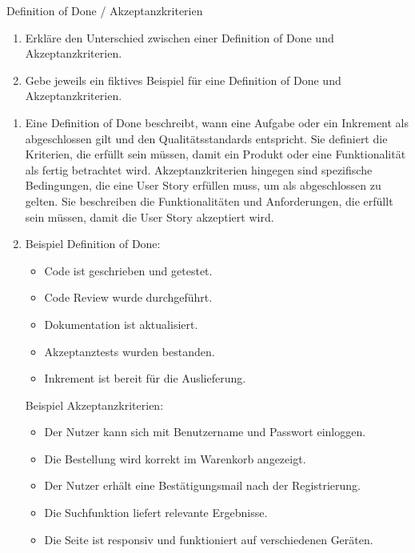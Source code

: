 \documentclass{article}
\begin{document}
\begin{exercise}{Definition of Done / Akzeptanzkriterien}
  \begin{enumerate}
    \item Erkläre den Unterschied zwischen einer Definition of Done und Akzeptanzkriterien.
    \item Gebe jeweils ein fiktives Beispiel für eine Definition of Done und Akzeptanzkriterien.
  \end{enumerate}

  \begin{solution}
    \begin{enumerate}
      \item Eine Definition of Done beschreibt, wann eine Aufgabe oder ein Inkrement als abgeschlossen gilt und den Qualitätsstandards entspricht. Sie definiert die Kriterien, die erfüllt sein müssen, damit ein Produkt oder eine Funktionalität als fertig betrachtet wird. Akzeptanzkriterien hingegen sind spezifische Bedingungen, die eine User Story erfüllen muss, um als abgeschlossen zu gelten. Sie beschreiben die Funktionalitäten und Anforderungen, die erfüllt sein müssen, damit die User Story akzeptiert wird.
      \item Beispiel Definition of Done:
            \begin{itemize}
              \item Code ist geschrieben und getestet.
              \item Code Review wurde durchgeführt.
              \item Dokumentation ist aktualisiert.
              \item Akzeptanztests wurden bestanden.
              \item Inkrement ist bereit für die Auslieferung.
            \end{itemize}
            Beispiel Akzeptanzkriterien:
            \begin{itemize}
              \item Der Nutzer kann sich mit Benutzername und Passwort einloggen.
              \item Die Bestellung wird korrekt im Warenkorb angezeigt.
              \item Der Nutzer erhält eine Bestätigungsmail nach der Registrierung.
              \item Die Suchfunktion liefert relevante Ergebnisse.
              \item Die Seite ist responsiv und funktioniert auf verschiedenen Geräten.
            \end{itemize}
    \end{enumerate}
  \end{solution}
\end{exercise}
\end{document}
